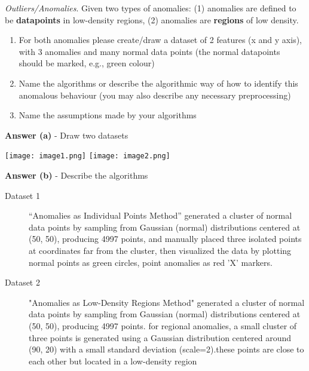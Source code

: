 \documentclass[a4paper,10pt]{article}\setlength{\textheight}{10in}\setlength{\textwidth}{6.5in}\setlength{\topmargin}{-0.125in}\setlength{\oddsidemargin}{-.2in}\setlength{\evensidemargin}{-.2in}\setlength{\headsep}{0.2in}\setlength{\footskip}{0pt}\usepackage{amsmath}\usepackage{fancyhdr}\usepackage{enumitem}\usepackage{hyperref}\usepackage{xcolor}\usepackage{graphicx}\usepackage[export]{adjustbox}\usepackage{caption}\usepackage{float}\usepackage{booktabs}\usepackage{makecell}\pagestyle{fancy}
\begin{document}
\begin{enumerate}[topsep=0mm, partopsep=0mm, leftmargin=*]
\begin{itemize}
    \end{itemize}


{\color{blue}
\clearpage\item \textit{Outliers/Anomalies}. Given two types of anomalies: (1) anomalies are defined to be \textbf{datapoints} in low-density regions, (2) anomalies are \textbf{regions} of low density.
\begin{enumerate}
\item For both anomalies please create/draw a dataset of 2 features (x and y axis), with 3 anomalies and many normal data points (the normal datapoints should be marked, e.g., green colour)
\item Name the algorithms or describe the algorithmic way of how to identify this anomalous behaviour (you may also describe any necessary preprocessing)
\item Name the assumptions made by your algorithms
\end{enumerate}}




\textbf{Answer (a)} - Draw two datasets %
    \begin{center}
    \texttt{[image: image1.png]}
        \hspace{2cm}
    \texttt{[image: image2.png]}
    \end{center}


\textbf{Answer (b)} - Describe the algorithms 
\begin{description}
	\item[Dataset 1] ``Anomalies as Individual Points Method'' generated a cluster of normal data points by sampling from Gaussian (normal) distributions centered at (50, 50), producing 4997 points, and manually placed three isolated points at coordinates far from the cluster, then visualized the data by plotting normal points as green circles, point anomalies as red 'X' markers.
	\item[Dataset 2] "Anomalies as Low-Density Regions Method" generated a cluster of normal data points by sampling from Gaussian (normal) distributions centered at (50, 50), producing 4997 points. for regional anomalies, a small cluster of three points is generated using a Gaussian distribution centered around (90, 20) with a small standard deviation (scale=2).these points are close to each other but located in a low-density region
\end{description}



\end{enumerate}
\end{document}
